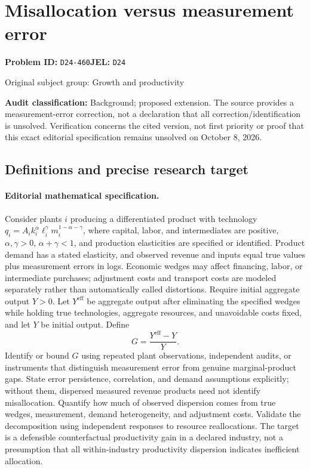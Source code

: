 \documentclass[11pt,a4paper]{article}
\begin{document}
\section*{Misallocation versus measurement error}
\textbf{Problem ID:} \texttt{D24-460}\quad \textbf{JEL:} \texttt{D24}\par
\label{problem:OP-0262}
{\sffamily\small\color{muted}Original subject group: Growth and productivity\par}
\label{definitions:problem:30007543}
\textbf{Audit classification:} Background; proposed extension. The source provides a measurement-error correction, not a declaration that all correction/identification is unsolved. Verification concerns the cited version, not first priority or proof that this exact editorial specification remains unsolved on October 8, 2026.
\subsection*{Definitions and precise research target}
\paragraph{Editorial mathematical specification.} Consider plants \(i\) producing a differentiated product with technology \(q_i=A_i k_i^\alpha \ell_i^\gamma m_i^{1-\alpha-\gamma}\), where capital, labor, and intermediates are positive, \(\alpha,\gamma>0\), \(\alpha+\gamma<1\), and production elasticities are specified or identified. Product demand has a stated elasticity, and observed revenue and inputs equal true values plus measurement errors in logs. Economic wedges may affect financing, labor, or intermediate purchases; adjustment costs and transport costs are modeled separately rather than automatically called distortions.
Require initial aggregate output \(Y>0\). Let \(Y^{\mathrm{eff}}\) be aggregate output after eliminating the specified wedges while holding true technologies, aggregate resources, and unavoidable costs fixed, and let \(Y\) be initial output. Define
\[
G=\frac{Y^{\mathrm{eff}}-Y}{Y}.
\]
Identify or bound \(G\) using repeated plant observations, independent audits, or instruments that distinguish measurement error from genuine marginal-product gaps. State error persistence, correlation, and demand assumptions explicitly; without them, dispersed measured revenue products need not identify misallocation. Quantify how much of observed dispersion comes from true wedges, measurement, demand heterogeneity, and adjustment costs. Validate the decomposition using independent responses to resource reallocations. The target is a defensible counterfactual productivity gain in a declared industry, not a presumption that all within-industry productivity dispersion indicates inefficient allocation.
\end{document}
